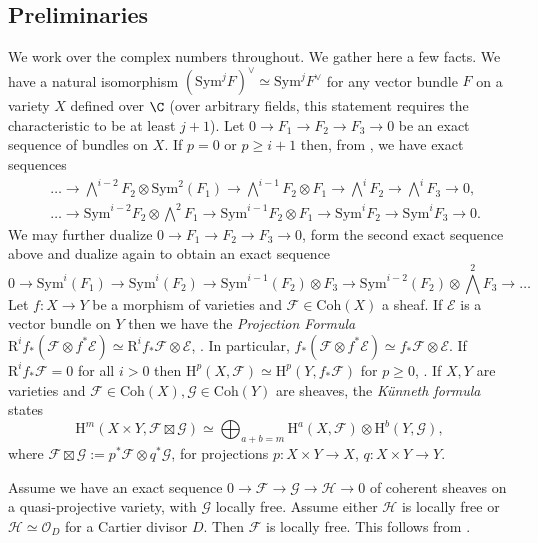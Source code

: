 \subsection{Preliminaries}
We work over the complex numbers throughout. We gather here a few facts. We have a natural isomorphism $(\mathrm{Sym}^j F)^{\vee} \simeq \mathrm{Sym}^j F^{\vee}$ for any vector bundle $F$ on a variety $X$ defined over $\C$ (over arbitrary fields, this statement requires the characteristic to be at least $j+1$). Let $0 \to F_1 \to F_2 \to F_3 \to 0$ be an exact sequence of bundles on $X$. If $p=0$ or $p \geq i+1$ then,
from \cite[\S V]{ABW}, we have exact sequences
{\small{\begin{align*}
&\ldots \to \bigwedge^{i-2} F_2 \otimes \mathrm{Sym}^2(F_1) \to \bigwedge^{i-1} F_2 \otimes F_1  \to \bigwedge^i F_2 \to \bigwedge^i F_3 \to 0, \\
& \ldots \to \mathrm{Sym}^{i-2}F_2 \otimes \bigwedge^2 F_1 \to \mathrm{Sym}^{i-1}F_2 \otimes F_1 \to \mathrm{Sym}^{i}F_2 \to \mathrm{Sym}^{i}F_3 \to 0.
\end{align*}}}
 We may further dualize $0 \to F_1 \to F_2 \to F_3 \to 0$, form the second exact sequence above and dualize again to obtain an exact sequence
{\small{$$
		0 \to \mathrm{Sym}^i(F_1) \to \mathrm{Sym}^{i}(F_2) \to \mathrm{Sym}^{i-1}(F_2) \otimes F_3 \to \mathrm{Sym}^{i-2}(F_2) \otimes \bigwedge^2 F_3 \to \ldots
$$}}
Let $f: X \to Y$ be a morphism of varieties and $\mathcal{F} \in \mathrm{Coh}(X)$ a sheaf. If $\mathcal{E}$ is a vector bundle on $Y$ then we have the \emph{Projection Formula} $\mathrm{R}^if_*(\mathcal{F} \otimes f^* \mathcal{E}) \simeq \mathrm{R}^if_*\mathcal{F} \otimes \mathcal{E}$, \cite[III, Ex.\ 8.3]{hartshorne}. In particular, $f_*(\mathcal{F} \otimes f^* \mathcal{E}) \simeq f_*\mathcal{F} \otimes \mathcal{E}$. If $\mathrm{R}^if_*\mathcal{F}=0$ for all $ i>0$ then $\mathrm{H}^p(X,\mathcal{F}) \simeq \mathrm{H}^p(Y, f_* \mathcal{F})$ for $p \geq 0$, \cite[III, Ex.\ 8.1 ]{hartshorne}. If $X, Y$ are varieties and $\mathcal{F} \in \mathrm{Coh}(X), \mathcal{G} \in \mathrm{Coh}(Y)$ are sheaves, the \emph{K\"unneth formula} states
 {\small{$$\mathrm{H}^{m}(X \times Y, \mathcal{F} \boxtimes \mathcal{G}) \simeq \bigoplus_{a+b=m} \mathrm{H}^a(X,\mathcal{F}) \otimes \mathrm{H}^b(Y, \mathcal{G}),$$}}
where $\mathcal{F} \boxtimes \mathcal{G}:=p^*\mathcal{F} \otimes q^* \mathcal{G}$, for projections $p: X \times Y \to X$, $q: X \times Y \to Y$.

 Assume we have an exact sequence $0 \to \mathcal{F} \to \mathcal{G} \to \mathcal{H} \to 0$ of coherent sheaves on a quasi-projective variety, with $\mathcal{G}$ locally free. Assume either $\mathcal{H}$ is locally free or $\mathcal{H} \simeq \mathcal{O}_D$ for a Cartier divisor $D$. Then $\mathcal{F}$ is locally free. This follows from \cite[III, Ex 6.5]{hartshorne}.
